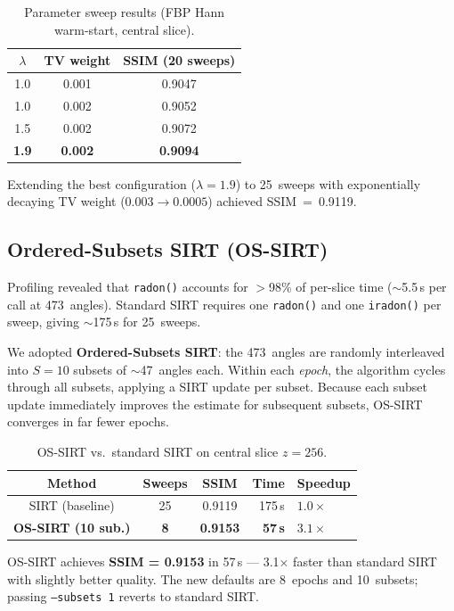 \documentclass[11pt,a4paper]{article}
\begin{document}
\begin{table}[h]
\centering
\begin{tabular}{ccc}
\toprule
$\lambda$ & TV weight & SSIM (20 sweeps) \\
\midrule
1.0 & 0.001 & 0.9047 \\
1.0 & 0.002 & 0.9052 \\
1.5 & 0.002 & 0.9072 \\
\textbf{1.9} & \textbf{0.002} & \textbf{0.9094} \\
\bottomrule
\end{tabular}
\caption{Parameter sweep results (FBP Hann warm-start, central slice).}
\end{table}

Extending the best configuration ($\lambda = 1.9$) to 25~sweeps with exponentially decaying TV weight ($0.003 \to 0.0005$) achieved SSIM~=~0.9119.

\subsection{Ordered-Subsets SIRT (OS-SIRT)}

Profiling revealed that \texttt{radon()} accounts for $>$98\% of per-slice time ($\sim$5.5\,s per call at 473~angles).  Standard SIRT requires one \texttt{radon()} and one \texttt{iradon()} per sweep, giving $\sim$175\,s for 25~sweeps.

We adopted \textbf{Ordered-Subsets SIRT}: the 473~angles are randomly interleaved into $S = 10$ subsets of $\sim$47~angles each.  Within each \emph{epoch}, the algorithm cycles through all subsets, applying a SIRT update per subset.  Because each subset update immediately improves the estimate for subsequent subsets, OS-SIRT converges in far fewer epochs.

\begin{table}[h]
\centering
\begin{tabular}{cccrl}
\toprule
\textbf{Method} & \textbf{Sweeps} & \textbf{SSIM} & \textbf{Time} & \textbf{Speedup} \\
\midrule
SIRT (baseline) & 25 & 0.9119 & 175\,s & $1.0\times$ \\
\textbf{OS-SIRT (10 sub.)} & \textbf{8} & \textbf{0.9153} & \textbf{57\,s} & $\mathbf{3.1\times}$ \\
\bottomrule
\end{tabular}
\caption{OS-SIRT vs.\ standard SIRT on central slice $z = 256$.}
\end{table}

OS-SIRT achieves \textbf{SSIM = 0.9153} in 57\,s --- 3.1$\times$ faster than standard SIRT with slightly better quality.  The new defaults are 8~epochs and 10~subsets; passing \texttt{--subsets 1} reverts to standard SIRT.
\end{document}
